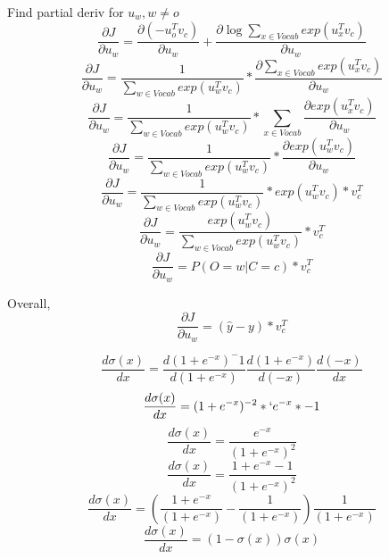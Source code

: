 \documentclass[11pt,largemargins]{homework}
\begin{document}
Find partial deriv for $u_w, w \ne o$
$$ \frac{\partial{J}}{\partial{u_w}} = \frac{\partial{(- u_o^T v_c)}}{\partial{u_w}} + \frac{\partial{\log{\sum_{x \in Vocab}{exp(u^T_x  v_c)}}}}{\partial{u_w}} $$
$$ \frac{\partial{J}}{\partial{u_w}} = \frac{1}{\sum_{w \in Vocab}{exp(u^T_w  v_c)}} * \frac{\partial{\sum_{x \in Vocab}{exp(u^T_x  v_c)}}}{\partial{u_w}} $$
$$ \frac{\partial{J}}{\partial{u_w}} = \frac{1}{\sum_{w \in Vocab}{exp(u^T_w  v_c)}} * \sum_{x \in Vocab}\frac{\partial{{exp(u^T_x  v_c)}}}{\partial{u_w}} $$
$$ \frac{\partial{J}}{\partial{u_w}} = \frac{1}{\sum_{w \in Vocab}{exp(u^T_w  v_c)}} * \frac{\partial{exp(u^T_w  v_c)}}{\partial{u_w}} $$
$$ \frac{\partial{J}}{\partial{u_w}} = \frac{1}{\sum_{w \in Vocab}{exp(u^T_w  v_c)}} *exp(u^T_w  v_c)* v_c^T $$
$$ \frac{\partial{J}}{\partial{u_w}} = \frac{exp(u^T_w  v_c)}{\sum_{w \in Vocab}{exp(u^T_w  v_c)}} * v_c^T $$
$$ \frac{\partial{J}}{\partial{u_w}} = P(O=w|C=c) * v_c^T $$

Overall, 
$$ \frac{\partial{J}}{\partial{u_w}} =  (\hat{y} - y) * v_c^T $$

\question
$$\frac{d{\sigma(x)}}{d{x}} = \frac{d(1+e^{-x})^-1}{d(1+e^{-x})} \frac{d(1+e^{-x})}{d(-x)} \frac{d(-x)}{d{x}}$$
$$\frac{d{\sigma(x)}}{d{x}} = (1+e^{-x})^{-2}*` e^{-x}* -1$$
$$\frac{d{\sigma(x)}}{d{x}} = \frac{ e^{-x}}{(1+e^{-x})^{2}}$$
$$\frac{d{\sigma(x)}}{d{x}} = \frac{ 1+e^{-x}-1}{(1+e^{-x})^{2}}$$
$$\frac{d{\sigma(x)}}{d{x}} = (\frac{ 1+e^{-x}}{(1+e^{-x})} - \frac{1}{(1+e^{-x})} ) \frac{ 1}{(1+e^{-x})}$$
$$\frac{d{\sigma(x)}}{d{x}} = (1 - \sigma{(x)}) \sigma{(x)} $$ 
\end{document}
